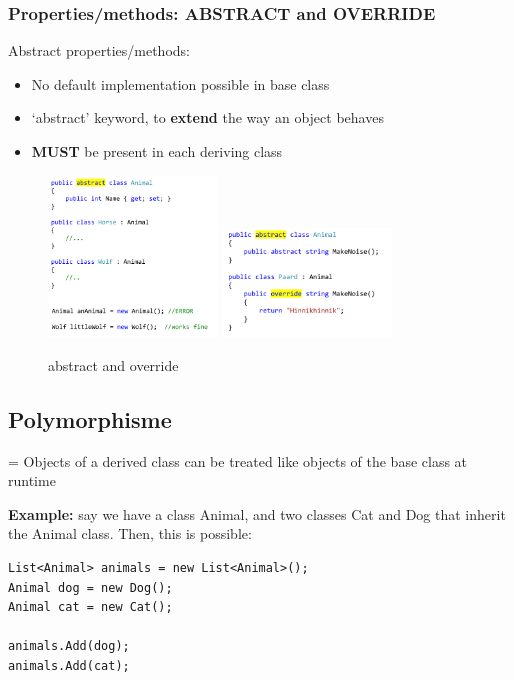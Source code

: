 \documentclass{article}
\newcommand{\bold}[1]{\textbf{#1}}
\begin{document}
\subsubsection{Properties/methods: ABSTRACT and OVERRIDE}

Abstract properties/methods:

\begin{itemize}
    \item No default implementation possible in base class
    \item `abstract' keyword, to \bold{extend} the way an object behaves
    \item \bold{MUST} be present in each deriving class
\end{itemize}

\begin{figure}[H]
    \centering
    \includegraphics[width=0.4\textwidth]{inheritance-abstract.png}
    \includegraphics[width=0.4\textwidth]{inheritance-abstract2.png}
    \caption{abstract and override}
\end{figure}


\subsection{Polymorphisme}

= Objects of a derived class can be treated like objects of the base class at runtime

\bold{Example:} say we have a class Animal, and two classes Cat and Dog that inherit the Animal class.
Then, this is possible: 

\begin{verbatim}
List<Animal> animals = new List<Animal>();
Animal dog = new Dog();
Animal cat = new Cat();

animals.Add(dog);
animals.Add(cat);
\end{verbatim}
\end{document}

